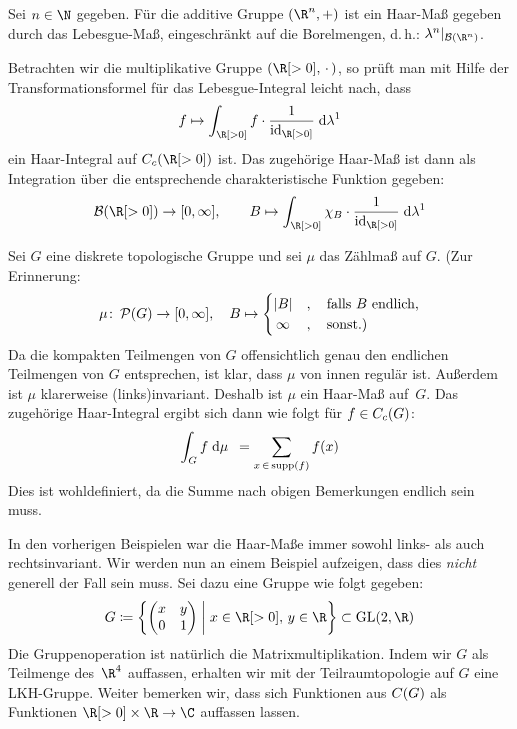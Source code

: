 \medskip
\begin{BspList}[\label{tg:haarbsp}]
\item
    Sei $n\in\N$ gegeben.
    Für die additive Gruppe $(\R^n,+)$ ist ein Haar-Maß gegeben durch das
    Lebesgue-Maß, eingeschränkt auf die Borelmengen, d.\,h.:
    $\lambda^n\vert_{\borelsigmaalg(\R^n)}$.
    
\item\label{tg:haarbsp:positivereals}
    Betrachten wir die multiplikative Gruppe $(\R[>0], \,\cdot\,)$, so prüft man mit
    Hilfe der Transformationsformel für das Lebesgue-Integral leicht nach, dass
    \[ f \mapsto \int_{\R[>0]} f \cdot \frac{1}{\id_{\R[>0]}} \dif{\lambda^1} \]
    ein Haar-Integral auf $\contcomp(\R[>0])$ ist. Das zugehörige Haar-Maß
    ist dann als Integration über die entsprechende charakteristische Funktion
    gegeben:
    \[ \borelsigmaalg(\R[>0])\to[0,\infty],\qquad
        B \mapsto \int_{\R[>0]} \chi_B \cdot \frac{1}{\id_{\R[>0]}} \dif{\lambda^1}
    \]
    
\item
    Sei $G$ eine diskrete topologische Gruppe und sei $\mu$ das Zählmaß auf $G$.
    (Zur Erinnerung:
    \[ \mu\colon\operatorname{\mathcal{P}}(G)\to[0,\infty], \quad B\mapsto \begin{cases}
            \lvert B\rvert &,\quad \text{falls $B$ endlich,}   \\
            \,\infty  &,\quad \text{sonst.)}
        \end{cases}
    \]
    Da die kompakten Teilmengen von $G$ offensichtlich genau den endlichen
    Teilmengen von $G$ entsprechen, ist klar, dass $\mu$ von innen regulär ist.
    Außerdem ist $\mu$ klarerweise (links)invariant.
    Deshalb ist $\mu$ ein Haar-Maß auf~$G$. Das zugehörige Haar-Integral ergibt
    sich dann wie folgt für $f\in C_c(G)$:
    \[ \int_G f \;\mathrm{d} \mu \mkern9mu = \sum_{x\,\in\,\operatorname{supp}(f)} f(x) \]
    Dies ist wohldefiniert, da die Summe nach obigen Bemerkungen endlich
    sein muss.
    
\item\label{tg:haarbsp:matgroup}
    In den vorherigen Beispielen war die Haar-Maße immer sowohl links- als auch
    rechtsinvariant. Wir werden nun an einem Beispiel aufzeigen, dass dies
    \emph{nicht} generell der Fall sein muss. Sei dazu eine Gruppe wie folgt
    gegeben:
    \[ G \defeq \left\{ \Matrix{x & y \\ 0 & 1} 
                \Mid[\;] x\in\R[>0],\,y\in\R \right\}
        \subset \matGL(2,\R)
    \]
    Die Gruppenoperation ist natürlich die Matrixmultiplikation. Indem wir
    $G$ als Teilmenge des~$\R^4$ auffassen, erhalten wir mit der
    Teilraumtopologie auf $G$ eine LKH-Gruppe. Weiter bemerken wir, dass sich
    Funktionen aus $C(G)$ als Funktionen $\R[>0]\times\R\to\C$
    auffassen lassen.
    

\end{BspList}
